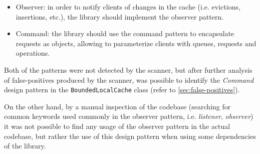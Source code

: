 \begin{itemize}
	\item Observer: in order to notify clients of changes in the cache (i.e. evictions, insertions, etc.), the library should implement the observer pattern.
	\item Command: the library should use the command pattern to encapsulate requests as objects, allowing to parameterize clients with queues, requests and operations.
\end{itemize}

\noindent Both of the patterns were not detected by the scanner, but after further analysis of false-positives produced by the scanner, was possible to identify the \textit{Command} design pattern in the \texttt{BoundedLocalCache} class (refer to \autoref{sec:false-positives}).

On the other hand, by a manual inspection of the codebase (searching for common keywords used commonly in the observer pattern, i.e. \textit{listener}, \textit{observer}) it was not possible to find any usage of the observer pattern in the actual codebase, but rather the use of this design pattern when using some dependencies of the library.


